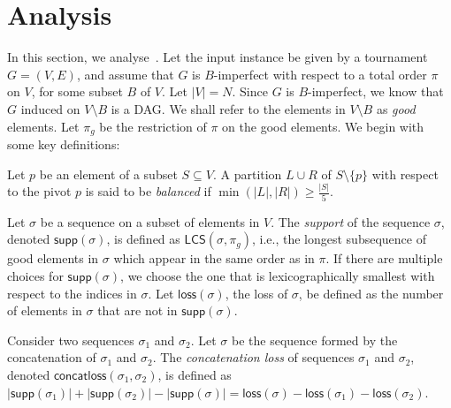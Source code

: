 \documentclass[11pt]{llncs}
\newcommand{\supp}{{\textsf{supp}}}
\newcommand{\loss}{{\textsf{loss}}}
\newcommand{\conloss}{{\textsf{concatloss}}}
\newcommand{\LCS}{{\textsf{LCS}}}
\begin{document}
\section{Analysis}
In this section, we analyse~. Let the input instance be given by a tournament $G=(V, E)$, and assume that $G$ is $B$-imperfect with respect to a total order $\pi$ on $V$, for some subset $B$ of $V$. Let $|V| = N$. Since $G$ is $B$-imperfect, we know that $G$ induced on $V \setminus B$ is a DAG. We shall refer to the elements in $V \setminus B$ as {\em good} elements. Let $\pi_g$ be the restriction of $\pi$ on the good elements. 
We begin with some key definitions: 

\begin{definition}
\label{def:balanced}
    Let $p$ be an element of a subset $S \subseteq V$. 
    A partition $L \cup R$ of $S \setminus \{p\}$ with respect to the pivot $p$ is said to be {\it balanced} if $\min(|L|, |R|) \geq \frac{|S|}{5}$.
\end{definition}

\begin{definition} Let $\sigma$ be a sequence on a subset of elements in $V$. 
    The {\em support} of the sequence $\sigma$, denoted $\supp(\sigma)$, is  defined as $\LCS(\sigma, \pi_g)$, i.e., the longest subsequence of good elements in $\sigma$ which appear in the same order as in $\pi$. If there are multiple choices for $\supp(\sigma)$,  we choose the one that is lexicographically smallest with respect to the indices in $\sigma$. Let $\loss(\sigma)$, the loss of $\sigma$,  be defined as the number of elements in $\sigma$ that are not in $\supp(\sigma)$.
\end{definition}

\begin{definition}
Consider two sequences $\sigma_1$ and $\sigma_2$. Let $\sigma$ be the sequence formed by the concatenation of $\sigma_1$ and $\sigma_2$. The {\em concatenation loss} of sequences $\sigma_1$ and $\sigma_2$, denoted  $\conloss(\sigma_1, \sigma_2)$, is defined as  $ |\supp(\sigma_1)| + |\supp(\sigma_2)| - |\supp(\sigma)|= \loss(\sigma) - \loss(\sigma_1) - \loss(\sigma_2)$. 
\end{definition}
\end{document}
